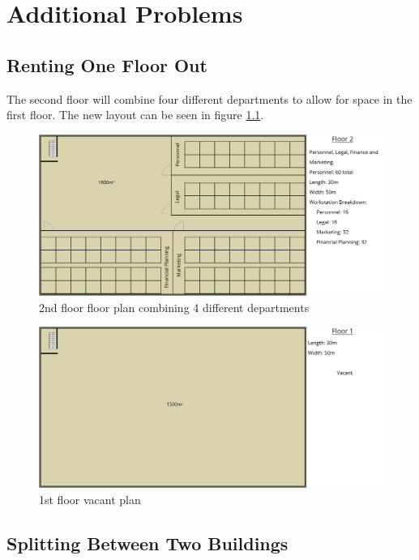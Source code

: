 \chapter{Additional Problems}

\section{Renting One Floor Out}

The second floor will combine four different departments to allow for space in the first floor. The new layout can be seen in figure \ref{fig:2nd_floor_varient}.
\begin{figure}[!h]
    \includegraphics[width=15cm]{Figures/2nd-Floor-Varient.png}
    \caption{2nd floor floor plan combining 4 different departments}
    \label{fig:2nd_floor_varient}
\end{figure}

\begin{figure}[h]
    \includegraphics[width=15cm]{Figures/1st-Floor-varient.png}
    \caption{1st floor vacant plan}
    \label{fig:1st_floor_empty}
\end{figure}

\section{Splitting Between Two Buildings}

